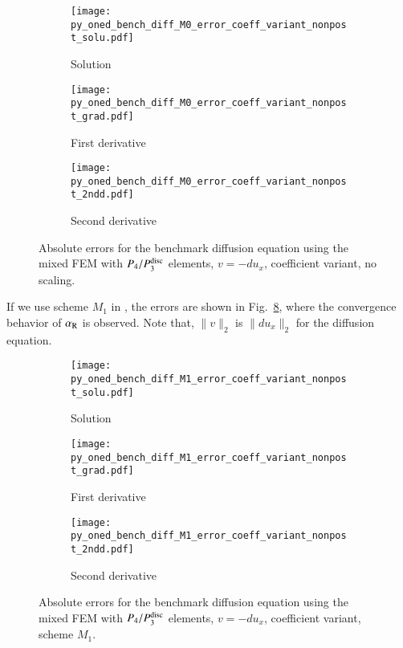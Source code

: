 \documentclass[review,3p]{elsarticle}
\begin{document}
\begin{figure}[!ht]
    \begin{subfigure}{5.5cm}
        \texttt{[image: py\_oned\_bench\_diff\_M0\_error\_coeff\_variant\_nonpost\_solu.pdf]}
        \caption{Solution}
        \label{py_oned_bench_diff_M0_error_coeff_variant_nonpost_solu}
    \end{subfigure}
    \hspace{-0.2cm}
    \begin{subfigure}{5.5cm}
        \texttt{[image: py\_oned\_bench\_diff\_M0\_error\_coeff\_variant\_nonpost\_grad.pdf]}
        \caption{First derivative}
        \label{py_oned_bench_diff_M0_error_coeff_variant_nonpost_grad}
    \end{subfigure}
    \hspace{-0.2cm}
    \begin{subfigure}{5.5cm}
        \texttt{[image: py\_oned\_bench\_diff\_M0\_error\_coeff\_variant\_nonpost\_2ndd.pdf]}
        \caption{Second derivative}
        \label{py_oned_bench_diff_M0_error_coeff_variant_nonpost_2ndd}
    \end{subfigure}
\caption{Absolute errors for the benchmark diffusion equation using the mixed FEM with $P_4/P_3^{\rm disc}$ elements, $v=-du_x$, coefficient variant, no scaling.}
\label{py_oned_bench_diff_M0_error_coeff_variant_nonpost}
\end{figure}


If we use scheme $M_1$ in \cite{liu2019balancing}, the errors are shown in Fig.~\ref{py_oned_bench_diff_M1_error_coeff_variant_nonpost}, where the convergence behavior of $\alpha_{\rm R}$ is observed. Note that, $\|v\|_2$ is $\|du_x\|_2$ for the diffusion equation.

\begin{figure}[!ht]
    \begin{subfigure}{5.5cm}
        \texttt{[image: py\_oned\_bench\_diff\_M1\_error\_coeff\_variant\_nonpost\_solu.pdf]}
        \caption{Solution}
        \label{py_oned_bench_diff_M1_error_coeff_variant_nonpost_solu}
    \end{subfigure}
    \hspace{-0.2cm}
    \begin{subfigure}{5.5cm}
        \texttt{[image: py\_oned\_bench\_diff\_M1\_error\_coeff\_variant\_nonpost\_grad.pdf]}
        \caption{First derivative}
        \label{py_oned_bench_diff_M1_error_coeff_variant_nonpost_grad}
    \end{subfigure}
    \hspace{-0.2cm}
    \begin{subfigure}{5.5cm}
        \texttt{[image: py\_oned\_bench\_diff\_M1\_error\_coeff\_variant\_nonpost\_2ndd.pdf]}
        \caption{Second derivative}
        \label{py_oned_bench_diff_M1_error_coeff_variant_nonpost_2ndd}
    \end{subfigure}
\caption{Absolute errors for the benchmark diffusion equation using the mixed FEM with $P_4/P_3^{\rm disc}$ elements, $v=-du_x$, coefficient variant, scheme $M_1$.}
\label{py_oned_bench_diff_M1_error_coeff_variant_nonpost}
\end{figure}
\end{document}

